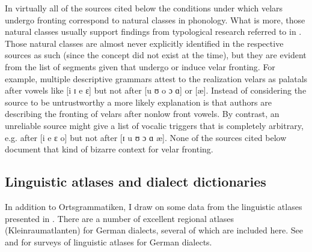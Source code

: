 \largerpage
In virtually all of the sources cited below the conditions under which velars undergo fronting correspond to natural classes in phonology. What is more, those natural classes usually support findings from typological research referred to in . Those natural classes are almost never explicitly identified in the respective sources as such (since the concept did not exist at the time), but they are evident from the list of segments given that undergo or induce velar fronting. For example, multiple descriptive grammars attest to the realization velars as palatals after vowels like [i ɪ e ɛ] but not after [u ʊ o ɔ ɑ] or [æ]. Instead of considering the source to be untrustworthy a more likely explanation is that authors are describing the fronting of velars after nonlow front vowels. By contrast, an unreliable source might give a list of vocalic triggers that is completely arbitrary, e.g. after [i e ɛ o] but not after [ɪ u ʊ ɔ ɑ æ]. None of the sources cited below document that kind of bizarre context for velar fronting.


\subsection{Linguistic atlases and dialect dictionaries}\label{sec:1.6.2}\largerpage[2]

In addition to Ortsgrammatiken, I draw on some data from the linguistic atlases presented in . There are a number of excellent regional atlases (Kleinraumatlanten) for German dialects, several of which are included here. See \citet{Scheuringer2011} and \citet[35--39]{NiebaumMacha2014} for surveys of linguistic atlases for German dialects.

